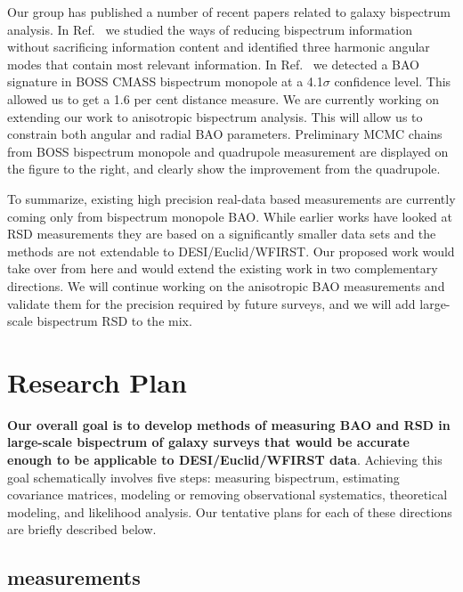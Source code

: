Our group has published a number of recent papers related to galaxy bispectrum
analysis. In Ref.~\cite{2017MNRAS.467..928G} we studied the ways of reducing
bispectrum information without sacrificing information content and identified
three harmonic angular modes that contain most relevant information. In
Ref.~\cite{2018MNRAS.478.4500P} we detected a BAO signature in BOSS CMASS
bispectrum monopole at a 4.1$\sigma$ confidence level. This allowed us to
get a 1.6 per cent distance measure. We are currently working on extending our
work to anisotropic bispectrum analysis. This will allow us to constrain both
angular and radial BAO parameters. Preliminary MCMC chains from BOSS bispectrum
monopole and quadrupole measurement are displayed on the figure to the right,
and clearly show the improvement from the quadrupole.

To summarize, existing high precision real-data based measurements are
currently coming only from bispectrum monopole BAO. While earlier works have
looked at RSD measurements they are based on a significantly smaller data sets
and the methods are not extendable to DESI/Euclid/WFIRST. Our proposed work
would take over from here and would extend the existing work in two
complementary directions. We will continue working on the anisotropic BAO
measurements and validate them for the precision required by future surveys,
and we will add large-scale bispectrum RSD to the mix.

\section{Research Plan}

\textbf{Our overall goal is to develop methods of measuring BAO and RSD in
large-scale bispectrum of galaxy surveys that would be accurate enough to be
applicable to DESI/Euclid/WFIRST data}. Achieving this goal schematically
involves five steps: measuring bispectrum, estimating covariance matrices,
modeling or removing observational systematics, theoretical modeling, and
likelihood analysis. Our tentative plans for each of these directions are
briefly described below.

\subsection*{measurements}

